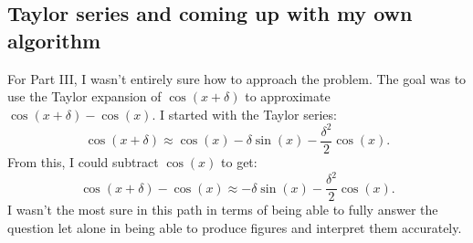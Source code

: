 \documentclass{article}
\begin{document}
\subsection{Taylor series and coming up with my own algorithm}
For Part III, I wasn’t entirely sure how to approach the problem. The goal was to use the Taylor expansion of \(\cos(x + \delta)\) to approximate \(\cos(x + \delta) - \cos(x)\). I started with the Taylor series:
\[
\cos(x + \delta) \approx \cos(x) - \delta \sin(x) - \frac{\delta^2}{2} \cos(x).
\]
From this, I could subtract \(\cos(x)\) to get:
\[
\cos(x + \delta) - \cos(x) \approx -\delta \sin(x) - \frac{\delta^2}{2} \cos(x).
\]
I wasn't the most sure in this path in terms of being able to fully answer the question let alone in being able to produce figures and interpret them accurately.
\end{document}
